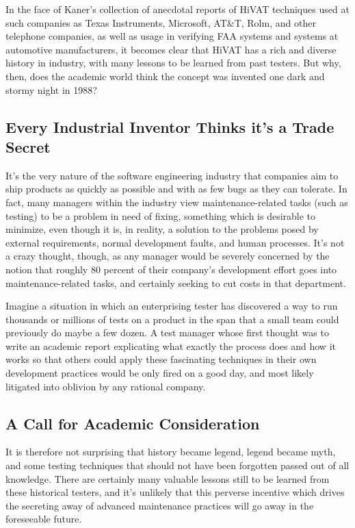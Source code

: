 In the face of Kaner's collection of anecdotal reports of HiVAT techniques used at such companies as Texas Instruments, Microsoft, AT\&T, Rolm, and other telephone companies, as well as usage in verifying FAA systems and systems at automotive manufacturers, it becomes clear that HiVAT has a rich and diverse history in industry, with many lessons to be learned from past testers. But why, then, does the academic world think the concept was invented one dark and stormy night in 1988?

\subsection{Every Industrial Inventor Thinks it's a Trade Secret}
It's the very nature of the software engineering industry that companies aim to ship products as quickly as possible and with as few bugs as they can tolerate. In fact, many managers within the industry view maintenance-related tasks (such as testing) to be a problem in need of fixing, something which is desirable to minimize, even though it is, in reality, a solution to the problems posed by external requirements, normal development faults, and human processes.\citep{glass2002Facts} It's not a crazy thought, though, as any manager would be severely concerned by the notion that roughly 80 percent of their company's development effort goes into maintenance-related tasks, and certainly seeking to cut costs in that department.\citep{pigoski1996practical}

Imagine a situation in which an enterprising tester has discovered a way to run thousands or millions of tests on a product in the span that a small team could previously do maybe a few dozen. A test manager whose first thought was to write an academic report explicating what exactly the process does and how it works so that others could apply these fascinating techniques in their own development practices would be only fired on a good day, and most likely litigated into oblivion by any rational company.

\subsection{A Call for Academic Consideration}
It is therefore not surprising that history became legend, legend became myth, and some testing techniques that should not have been forgotten passed out of all knowledge. There are certainly many valuable lessons still to be learned from these historical testers, and it's unlikely that this perverse incentive which drives the secreting away of advanced maintenance practices will go away in the foreseeable future.

